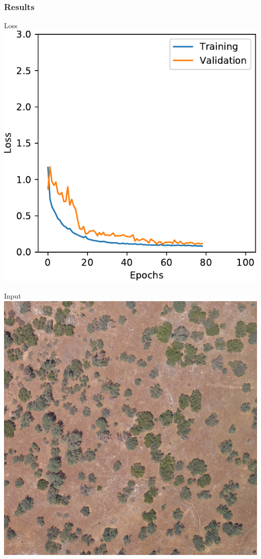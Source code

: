 \documentclass[usenames,dvipsnames,10pt]{beamer}
\begin{document}
\begin{frame}
\frametitle{Results}
\begin{minipage}[]{0.3\textwidth}
	\centering
	Loss
	\includegraphics[width=\textwidth]{graphics/loss08.pdf}
\end{minipage}
\hspace{0.25cm}
\begin{minipage}[]{0.3\textwidth}
	\centering
	Input
	\includegraphics[width=\textwidth]{graphics/aerial08.jpg}

\end{minipage}
\end{frame}
\end{document}
